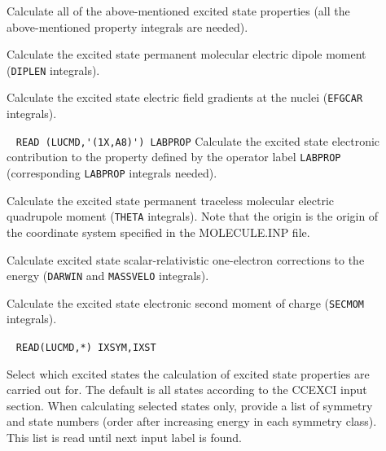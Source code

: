 \begin{description}
\item[]
        Calculate all of the above-mentioned excited state properties (all the
        above-mentioned property integrals are needed).
%
\item[]
        Calculate the excited state permanent molecular electric dipole moment
        (\verb+DIPLEN+ integrals).
%
\item[]
        Calculate the excited state electric field gradients at the nuclei
        (\verb+EFGCAR+ integrals).
%
\item[] \verb| |\newline
\verb|READ (LUCMD,'(1X,A8)') LABPROP|\newline
        Calculate the excited state electronic contribution to the property defined
        by the operator label \verb+LABPROP+ (corresponding
        \verb+LABPROP+ integrals needed).

\item[]
        Calculate the excited state permanent traceless molecular electric
        quadrupole moment (\verb+THETA+ integrals). Note that the
        origin is the origin of the coordinate system specified
        in the MOLECULE.INP file.
%
\item[]
        Calculate excited state scalar-relativistic one-electron
        corrections to the 
        energy (\verb+DARWIN+ and \verb+MASSVELO+ integrals).
%
\item[]
        Calculate the excited state electronic second moment of charge
        (\verb+SECMOM+ integrals).
%

\item[]  \verb| |\newline
\verb|READ(LUCMD,*) IXSYM,IXST|

Select which excited states the calculation of excited state properties 
are carried out for. The default is all states according to the CCEXCI input section.
When calculating selected states only,
provide a list of symmetry and state numbers (order after increasing energy in
each symmetry class).
This list is read until next input label is found.



\end{description}

